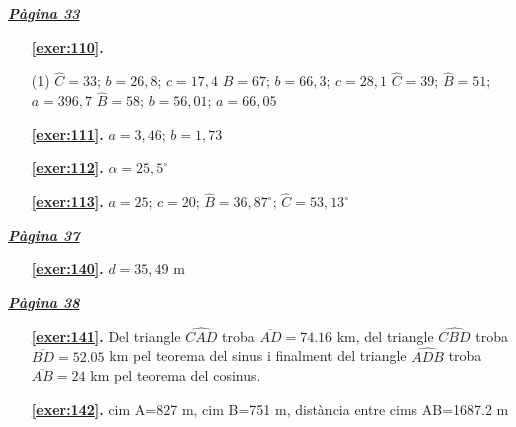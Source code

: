 \hyperlink{page.33}{\textbf{\em Pàgina 33}}
\begin{enumerate}



 \item[\fontfamily{phv}\selectfont\color{blue}\textbf{\ref{exer:110}. }] \label{ans:110}
 \begin{tasks}[column-sep=1em, item-indent=1.3333em](1)
	 \task* $\hat C=33$; $b=26,8$; $c=17,4$
	 \task* $\hat B=67$; $b=66,3$; $c=28,1$
	 \task* $\hat C=39$; $\hat B=51$; $a=396,7$
	 \task* $\hat B=58$; $b=56,01$; $a=66,05$
\end{tasks}
 \end{enumerate}
\begin{enumerate}
\item[\fontfamily{phv}\selectfont\color{blue}\textbf{\ref{exer:111}. }] \label{ans:111} 
$a=3,46$; $b=1,73$
\item[\fontfamily{phv}\selectfont\color{blue}\textbf{\ref{exer:112}. }] \label{ans:112} 
$\alpha =25,5^\circ $
\item[\fontfamily{phv}\selectfont\color{blue}\textbf{\ref{exer:113}. }] \label{ans:113} 
 $a=25$; $c=20$; $\hat B=36,87^\circ $; $\hat C=53,13^\circ $
 \end{enumerate}
\vspace{0.3cm}


\hyperlink{page.37}{\textbf{\em Pàgina 37}}
\begin{enumerate}
\item[\fontfamily{phv}\selectfont\color{blue}\textbf{\ref{exer:140}. }] \label{ans:140} 
$d=35,49$ m
 \end{enumerate}
\vspace{0.3cm}


\hyperlink{page.38}{\textbf{\em Pàgina 38}}
\begin{enumerate}
\item[\fontfamily{phv}\selectfont\color{blue}\textbf{\ref{exer:141}. }] \label{ans:141} 
Del triangle $\widehat {CAD}$ troba $\overline {AD}=74.16$ km, del triangle $\widehat {CBD}$ troba $\overline {BD}=52.05$ km pel teorema del sinus i finalment del triangle $\widehat {ADB}$ troba $\overline {AB}=24$ km pel teorema del cosinus.
 \end{enumerate}
\begin{enumerate}
\item[\fontfamily{phv}\selectfont\color{blue}\textbf{\ref{exer:142}. }] \label{ans:142} 
cim A=827 m, cim B=751 m, distància entre cims AB=1687.2 m
 \end{enumerate}
\vspace{0.3cm}

